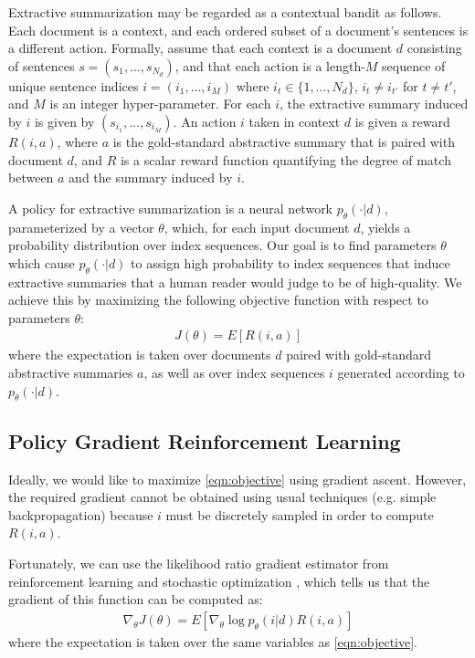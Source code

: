 \documentclass[11pt,a4paper]{article}
\begin{document}
Extractive summarization may be regarded as a contextual bandit as follows. Each document is a context, and each ordered subset of a document's sentences is a different action. Formally, assume that each context is a document $d$ consisting of sentences $s = (s_1, \dots, s_{N_d})$, and that each action is a length-$M$ sequence of unique sentence indices $i = (i_1, \dots, i_M)$ where $i_t \in \{1, \dots, N_d\}$, $i_t \neq i_{t'}$ for $t \neq t'$, and $M$ is an integer hyper-parameter. For each $i$, the extractive summary induced by $i$ is given by $(s_{i_1}, \dots, s_{i_M})$. An action $i$ taken in context $d$ is given a reward $R(i, a)$, where $a$ is the gold-standard abstractive summary that is paired with document $d$, and $R$ is a scalar reward function quantifying the degree of match between $a$ and the summary induced by $i$.

A policy for extractive summarization is a neural network $p_\theta(\cdot | d)$, parameterized by a vector $\theta$, which, for each input document $d$, yields a probability distribution over index sequences. Our goal is to find parameters $\theta$ which cause $p_\theta(\cdot|d)$ to assign high probability to index sequences that induce extractive summaries that a human reader would judge to be of high-quality. We achieve this by maximizing the following objective function with respect to parameters $\theta$:
\begin{align}
    J(\theta) = E\left[R(i, a)\right]\label{eqn:objective}
\end{align}
where the expectation is taken over documents $d$ paired with gold-standard abstractive summaries $a$, as well as over index sequences $i$ generated according to $p_\theta(\cdot | d)$.

\subsection{Policy Gradient Reinforcement Learning}
Ideally, we would like to maximize \eqref{eqn:objective} using gradient ascent. However, the required gradient cannot be obtained using usual techniques (e.g. simple backpropagation) because $i$ must be discretely sampled in order to compute $R(i, a)$.

Fortunately, we can use the likelihood ratio gradient estimator from reinforcement learning and stochastic optimization \cite{williams1992simple, sutton2000policy}, which tells us that the gradient of this function can be computed as:
\begin{align}
    \nabla_\theta J(\theta) = E\left[ \nabla_\theta \log p_\theta(i | d) R(i, a) \right] \label{eqn:gradient}
\end{align}
where the expectation is taken over the same variables as \eqref{eqn:objective}.
\end{document}
